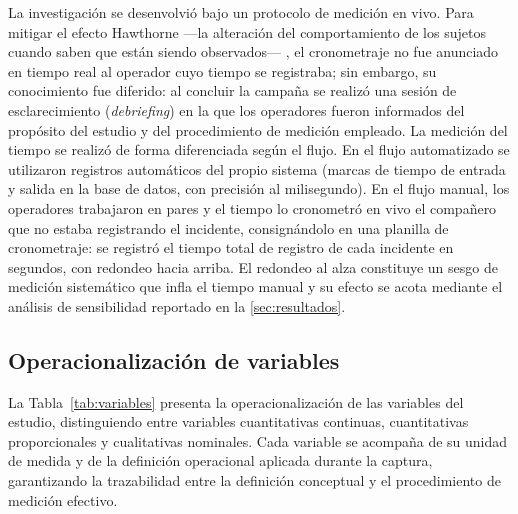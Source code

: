 La investigación se desenvolvió bajo un protocolo de medición en vivo. Para mitigar el efecto Hawthorne ---la alteración del comportamiento de los sujetos cuando saben que están siendo observados--- \parencite{HernandezSampieri2018_metodologia}, el cronometraje no fue anunciado en tiempo real al operador cuyo tiempo se registraba; sin embargo, su conocimiento fue diferido: al concluir la campaña se realizó una sesión de esclarecimiento (\emph{debriefing}) en la que los operadores fueron informados del propósito del estudio y del procedimiento de medición empleado. La medición del tiempo se realizó de forma diferenciada según el flujo. En el flujo automatizado se utilizaron registros automáticos del propio sistema (marcas de tiempo de entrada y salida en la base de datos, con precisión al milisegundo). En el flujo manual, los operadores trabajaron en pares y el tiempo lo cronometró en vivo el compañero que no estaba registrando el incidente, consignándolo en una planilla de cronometraje: se registró el tiempo total de registro de cada incidente en segundos, con redondeo hacia arriba. El redondeo al alza constituye un sesgo de medición sistemático que infla el tiempo manual y su efecto se acota mediante el análisis de sensibilidad reportado en la \autoref{sec:resultados}.

\subsection{Operacionalización de variables}\label{subsec:operacionalizacion-variables}

La Tabla~\ref{tab:variables} presenta la operacionalización de las variables del estudio, distinguiendo entre variables cuantitativas continuas, cuantitativas proporcionales y cualitativas nominales. Cada variable se acompaña de su unidad de medida y de la definición operacional aplicada durante la captura, garantizando la trazabilidad entre la definición conceptual y el procedimiento de medición efectivo.

